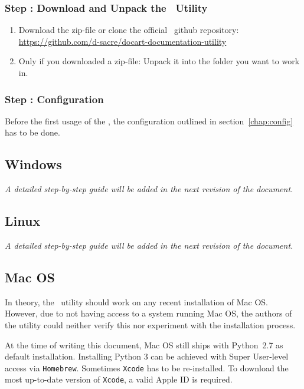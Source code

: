 		\subsubsection{Step \thestep: Download and Unpack the \productName~Utility}
			\begin{enumerate}[label={Step 6.\arabic*:},leftmargin=*]
				\setlength\itemsep{-0.2em}
				\item Download the zip-file or clone the official \productName~github repository:\\
				\href{https://github.com/d-sacre/docart-documentation-utility}{https://github.com/d-sacre/docart-documentation-utility}
				\item Only if you downloaded a zip-file: Unpack it into the folder you want to work in.
			\end{enumerate}
			
		
		\subsubsection{Step \thestep: Configuration}
			Before the first usage of the \productName, the configuration outlined in \mbox{section \ref{chap:config}} has to be done.
		
		\subsection{Windows}
			\label{installation:mandatory:windows}
			\textit{A detailed step-by-step guide will be added in the next revision of the document.}
		
		\subsection{Linux}
			\label{installation:mandatory:linux}
			\textit{A detailed step-by-step guide will be added in the next revision of the document.}
		
		\subsection{Mac OS}
			\label{installation:mandatory:macos}
			In theory, the \productName~utility should work on any recent installation of Mac OS. However, due to not having access to a system running Mac OS, the authors of the utility could neither verify this nor experiment with the installation process.
			\begin{daWarningBox}
				At the time of writing this document, Mac OS still ships with \mbox{Python 2.7} as default installation. Installing Python 3 can be achieved with Super User-level access via \lstinline{Homebrew}. Sometimes \lstinline{Xcode} has to be re-installed. To download the most up-to-date version of \lstinline{Xcode}, a valid Apple ID is required.
			\end{daWarningBox}
			
